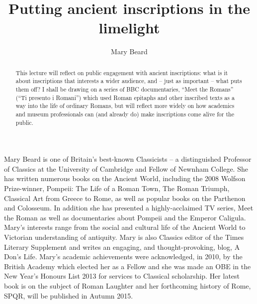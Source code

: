 \documentclass[amsthm,ebook]{saparticle}
\title{Putting ancient inscriptions in the limelight}
\author[]{Mary Beard\corref{first}}
\begin{document}
\maketitle
\begin{abstract}
This lecture will reflect on public engagement with ancient inscriptions: what is it about inscriptions that interests a wider audience, and -- just as important -- what puts them off? I shall be drawing on a series of BBC documentaries, ``Meet the Romans'' (``Ti presento i Romani'') which used Roman epitaphs and other inscribed texts as a way into the life of ordinary Romans, but will reflect more widely on how academics and museum professionals can (and already do) make inscriptions come alive for the public.
\end{abstract}

Mary Beard is one of Britain’s best-known Classicists – a distinguished Professor of Classics at the University of Cambridge and Fellow of Newnham College. She has written numerous books on the Ancient World, including the 2008 Wolfson Prize-winner, Pompeii: The Life of a Roman Town, The Roman Triumph, Classical Art from Greece to Rome, as well as popular books on the Parthenon and Colosseum. In addition she has presented a highly-acclaimed TV series, Meet the Roman as well as documentaries about Pompeii and the Emperor Caligula. Mary’s interests range from the social and cultural life of the Ancient World to Victorian understanding of antiquity. Mary is also Classics editor of the Times Literary Supplement and writes an engaging, and thought-provoking, blog, A Don’s Life. Mary’s academic achievements were acknowledged, in 2010, by the British Academy which elected her as a Fellow and she was made an OBE in the New Year’s Honours List 2013 for services to Classical scholarship. Her latest book is on the subject of Roman Laughter and her forthcoming history of Rome, SPQR, will be published in Autumn 2015.
\end{document}
